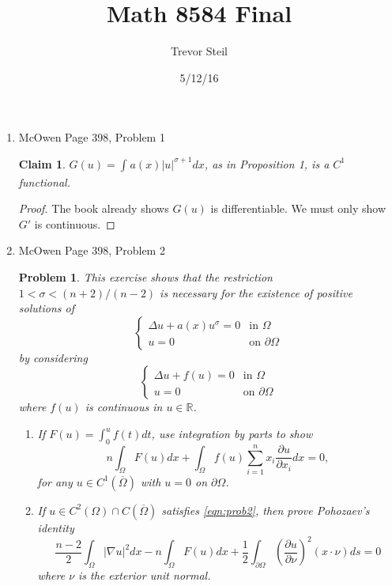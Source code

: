 \documentclass[a4paper]{article}
\title{Math 8584 Final }
\date{5/12/16}
\author{Trevor Steil}
\newtheorem*{claim}{Claim}
\newtheorem*{problem}{Problem}
\newcommand{\R}{\mathbb{R}}
\begin{document}
\maketitle

\begin{enumerate}
  \item McOwen Page 398, Problem 1
    \begin{claim} $G(u) = \int_{}^{} a(x) |u|^{\sigma + 1} dx$, as in Proposition 1, is a $C^1$ functional.
    \end{claim}

    \begin{proof}
      The book already shows $G(u)$ is differentiable. We must only show $G'$ is continuous.
    \end{proof}

    \pagebreak

  \item McOwen Page 398, Problem 2
    \begin{problem}
      This exercise shows that the restriction $1 < \sigma < (n+2)/(n-2)$ is necessary for the existence of positive solutions of
      \[ \begin{cases}
          \Delta u + a(x) u^\sigma = 0 &\text{in } \Omega \\
          u = 0 &\text{on } \partial \Omega
        \end{cases} \]
        by considering
        \begin{equation}
          \begin{cases}
            \Delta u + f(u) = 0 &\text{in } \Omega \\
            u=0 &\text{on } \partial \Omega
          \end{cases}
          \label{eqn:prob2}
        \end{equation}
        where $f(u)$ is continuous in $u \in \R$.

        \begin{enumerate}
          \item
            If $F(u) = \int_{0}^{u} f(t)dt$, use integration by parts to show
            \[n \int_{\Omega}^{} F(u) dx + \int_{\Omega}^{} f(u) \sum_{i=1}^n x_i \frac{\partial u}{\partial x_i} dx = 0 ,\]
            for any $u \in C^1( \overline{\Omega} )$ with $u=0$ on $\partial \Omega$.

          \item
            If $u \in C^2(\Omega) \cap C( \overline{\Omega} )$ satisfies \eqref{eqn:prob2}, then prove Pohozaev's identity
            \[ \frac{n-2}{2} \int_{\Omega}^{} |\nabla u|^2 dx - n \int_{\Omega}^{} F(u)dx + \frac{1}{2} \int_{\partial \Omega}^{} \left(
            \frac{\partial u}{\partial \nu} \right)^2 (x \cdot \nu) ds = 0 \]
            where $\nu$ is the exterior unit normal.


\end{enumerate}
\end{problem}
\end{enumerate}
\end{document}
